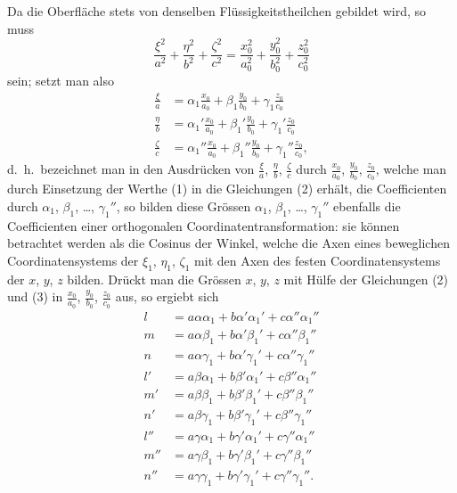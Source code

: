 \documentclass[12pt,a4paper]{book}
\theoremstyle{definition}
\theoremstyle{remark}
\begin{document}
Da die Oberfl\"ache stets von denselben Fl\"ussigkeitstheilchen gebildet wird, so muss
\[
\frac{\xi^{2}}{a^{2}} + \frac{\eta^{2}}{b^{2}} + \frac{\zeta^{2}}{c^{2}} = \frac{x_{0}^{2}}{a_{0}^{2}} + \frac{y_{0}^{2}}{b_{0}^{2}} + \frac{z_{0}^{2}}{c_{0}^{2}}
\]
sein; setzt man also
\begin{align*}
\frac{\xi}{a} &= \alpha_{1}\frac{x_{0}}{a_{0}} + \beta_{1}\frac{y_{0}}{b_{0}} + \gamma_{1}\frac{z_{0}}{c_{0}}\\
\frac{\eta}{b} &= \alpha_{1}'\frac{x_{0}}{a_{0}} + \beta_{1}'\frac{y_{0}}{b_{0}} + \gamma_{1}'\frac{z_{0}}{c_{0}}\\
\frac{\zeta}{c} &= \alpha_{1}''\frac{x_{0}}{a_{0}} + \beta_{1}''\frac{y_{0}}{b_{0}} + \gamma_{1}''\frac{z_{0}}{c_{0}},\tag{3}
\end{align*}
d.~h.~bezeichnet man in den Ausdr\"ucken von $\frac{\xi}{a}$, $\frac{\eta}{b}$, $\frac{\zeta}{c}$ durch $\frac{x_{0}}{a_{0}}$, $\frac{y_{0}}{b_{0}}$, $\frac{z_{0}}{c_{0}}$, welche man durch Einsetzung der Werthe (1) in die Gleichungen (2) erh\"alt, die Coefficienten durch $\alpha_{1}$, $\beta_{1}$, \dots, $\gamma_{1}''$, so bilden diese Gr\"ossen $\alpha_{1}$, $\beta_{1}$, \dots, $\gamma_{1}''$ ebenfalls die Coefficienten einer orthogonalen Coordinatentransformation: sie k\"onnen betrachtet werden als die Cosinus der Winkel, welche die Axen eines beweglichen Coordinatensystems der $\xi_{1}$, $\eta_{1}$, $\zeta_{1}$ mit den Axen des festen Coordinatensystems der $x$, $y$, $z$ bilden. Dr\"uckt man die Gr\"ossen $x$, $y$, $z$ mit H\"ulfe der Gleichungen (2) und (3) in $\frac{x_{0}}{a_{0}}$, $\frac{y_{0}}{b_{0}}$, $\frac{z_{0}}{c_{0}}$ aus, so ergiebt sich
\begin{align*}
l &= a\alpha\alpha_{1} + b\alpha'\alpha_{1}' + c\alpha''\alpha_{1}''\\
m &= a\alpha\beta_{1} + b\alpha'\beta_{1}' + c\alpha''\beta_{1}''\\
n &= a\alpha\gamma_{1} + b\alpha'\gamma_{1}' + c\alpha''\gamma_{1}''\\
l' &= a\beta\alpha_{1} + b\beta'\alpha_{1}' + c\beta''\alpha_{1}''\\
m' &= a\beta\beta_{1} + b\beta'\beta_{1}' + c\beta''\beta_{1}''\\
n' &= a\beta\gamma_{1} + b\beta'\gamma_{1}' + c\beta''\gamma_{1}''\\
l'' &= a\gamma\alpha_{1} + b\gamma'\alpha_{1}' + c\gamma''\alpha_{1}''\\
m'' &= a\gamma\beta_{1} + b\gamma'\beta_{1}' + c\gamma''\beta_{1}''\\
n'' &= a\gamma\gamma_{1} + b\gamma'\gamma_{1}' + c\gamma''\gamma_{1}''.\tag{4}
\end{align*}
\end{document}
